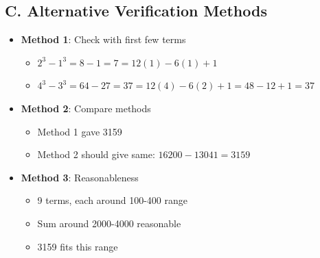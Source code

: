 \documentclass[12pt]{article}
\begin{document}
\begin{verificationbox}
\subsection*{C. Alternative Verification Methods}
\begin{itemize}[leftmargin=*]
    \item \textbf{Method 1}: Check with first few terms
    \begin{itemize}
        \item $2^3 - 1^3 = 8 - 1 = 7 = 12(1) - 6(1) + 1$ \checkmark
        \item $4^3 - 3^3 = 64 - 27 = 37 = 12(4) - 6(2) + 1 = 48 - 12 + 1 = 37$ \checkmark
    \end{itemize}
    \item \textbf{Method 2}: Compare methods
    \begin{itemize}
        \item Method 1 gave 3159
        \item Method 2 should give same: $16200 - 13041 = 3159$ \checkmark
    \end{itemize}
    \item \textbf{Method 3}: Reasonableness
    \begin{itemize}
        \item 9 terms, each around 100-400 range
        \item Sum around 2000-4000 reasonable
        \item 3159 fits this range
    \end{itemize}
\end{itemize}
\end{verificationbox}
\end{document}
